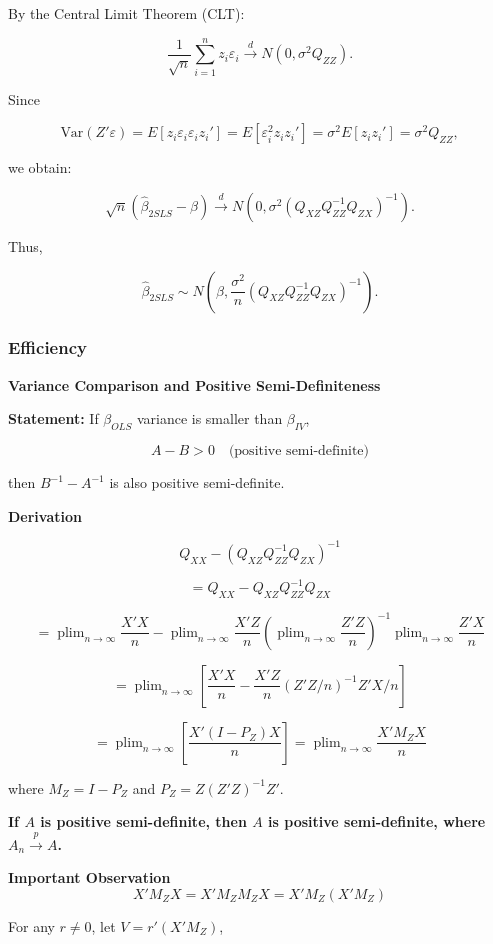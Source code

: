 \documentclass[12pt, oneside]{article}
\DeclareMathOperator*{\plim}{plim}
\begin{document}
By the Central Limit Theorem (CLT):

\[
\frac{1}{\sqrt{n}} \sum_{i=1}^{n} z_i \varepsilon_i \xrightarrow{d} N(0, \sigma^2 Q_{ZZ}).
\]

Since

\[
\text{Var}(Z'\varepsilon) = E[z_i \varepsilon_i \varepsilon_i z_i'] = E[\varepsilon_i^2 z_i z_i'] = \sigma^2 E[z_i z_i'] = \sigma^2 Q_{ZZ},
\]

we obtain:

\[
\sqrt{n} (\hat{\beta}_{2SLS} - \beta) \xrightarrow{d} N(0, \sigma^2 (Q_{XZ} Q_{ZZ}^{-1} Q_{ZX})^{-1}).
\]

Thus,

\[
\hat{\beta}_{2SLS} \sim N(\beta, \frac{\sigma^2}{n} (Q_{XZ} Q_{ZZ}^{-1} Q_{ZX})^{-1}).
\]

\subsubsection{Efficiency}
\textbf*{Variance Comparison and Positive Semi-Definiteness}

\textbf{Statement:} If \( \beta_{OLS} \) variance is smaller than \( \beta_{IV} \),

\[
A - B > 0 \quad \text{(positive semi-definite)}
\]

then \( B^{-1} - A^{-1} \) is also positive semi-definite.

\textbf*{Derivation}

\[
Q_{XX} - (Q_{XZ} Q_{ZZ}^{-1} Q_{ZX})^{-1}
\]

\[
= Q_{XX} - Q_{XZ} Q_{ZZ}^{-1} Q_{ZX}
\]

\[
= \plim_{n \to \infty} \frac{X'X}{n} - \plim_{n \to \infty} \frac{X'Z}{n} \left( \plim_{n \to \infty} \frac{Z'Z}{n} \right)^{-1} \plim_{n \to \infty} \frac{Z'X}{n}
\]

\[
= \plim_{n \to \infty} \left[ \frac{X'X}{n} - \frac{X'Z}{n} (Z'Z/n)^{-1} Z'X/n \right]
\]

\[
= \plim_{n \to \infty} \left[ \frac{X'(I - P_Z) X}{n} \right] = \plim_{n \to \infty} \frac{X' M_Z X}{n}
\]

where \( M_Z = I - P_Z \) and \( P_Z = Z (Z'Z)^{-1} Z' \).

\textbf{If \( A \) is positive semi-definite, then \( A \) is positive semi-definite, where \( A_n \xrightarrow{p} A \).}

\textbf*{Important Observation}
\[
X' M_Z X = X' M_Z M_Z X = X' M_Z (X' M_Z)
\]

For any \( r \neq 0 \), let \( V = r' (X' M_Z) \),
\end{document}
